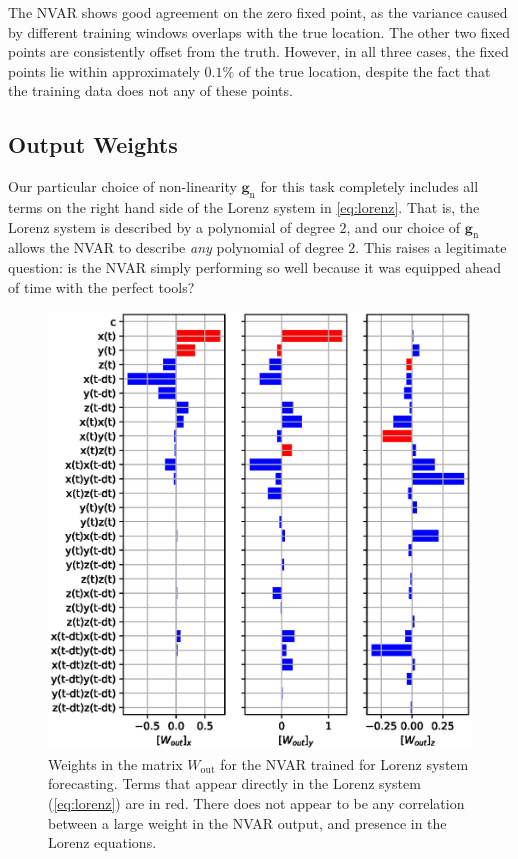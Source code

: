 The NVAR shows good agreement on the zero fixed point, as the variance
caused by different training windows overlaps with the true
location. The other two fixed points are consistently offset from the
truth. However, in all three cases, the fixed points lie within
approximately $0.1\%$ of the true location, despite the fact that the
training data does not any of these points.

\subsection{Output Weights}

Our particular choice of non-linearity $\bm{g}_\text{n}$ for this task
completely includes all terms on the right hand side of the Lorenz
system in \cref{eq:lorenz}. That is, the Lorenz system is described by
a polynomial of degree $2$, and our choice of $\bm{g}_\text{n}$ allows
the NVAR to describe \emph{any} polynomial of degree $2$. This raises
a legitimate question: is the NVAR simply performing so well because
it was equipped ahead of time with the perfect tools?

\begin{figure}
  \includegraphics{figures/nvar-predict-lorenz-wout}
  \caption{Weights in the matrix $W_\text{out}$ for the NVAR trained
    for Lorenz system forecasting. Terms that appear directly in the
    Lorenz system (\cref{eq:lorenz}) are in red. There does not appear
    to be any correlation between a large weight in the NVAR output,
    and presence in the Lorenz equations.}
  \label{fig:nvar-predict-lorenz-wout}
\end{figure}

